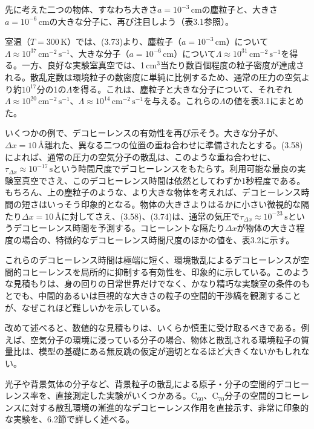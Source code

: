 \hypertarget{srcpage:138}{}\label{srcpage:138}
先に考えた二つの物体、すなわち大きさ$a=10^{-3}\,\mathrm{cm}$の塵粒子と、大きさ$a=10^{-6}\,\mathrm{cm}$の大きな分子に、再び注目しよう（表3.1参照）。

室温（$T=300\,\mathrm K$）では、(3.73)より、塵粒子（$a=10^{-3}\,\mathrm{cm}$）について$\Lambda\approx10^{37}\,\mathrm{cm}^{-2}\,\mathrm s^{-1}$、大きな分子（$a=10^{-6}\,\mathrm{cm}$）について$\Lambda\approx10^{31}\,\mathrm{cm}^{-2}\,\mathrm s^{-1}$を得る。一方、良好な実験室真空では、1\,cm$^3$当たり数百個程度の粒子密度が達成される\cite[p.~267]{ref169}。散乱定数は環境粒子の数密度に単純に比例するため、通常の圧力の空気より約$10^{17}$分の1の$\Lambda$を得る。これは、塵粒子と大きな分子について、それぞれ$\Lambda\approx10^{20}\,\mathrm{cm}^{-2}\,\mathrm s^{-1}$、$\Lambda\approx10^{14}\,\mathrm{cm}^{-2}\,\mathrm s^{-1}$を与える。これらの$\Lambda$の値を表3.1にまとめた。

いくつかの例で、デコヒーレンスの有効性を再び示そう。大きな分子が、$\Delta x=10\,\text{\AA}$離れた、異なる二つの位置の重ね合わせに準備されたとする。(3.58)によれば、通常の圧力の空気分子の散乱は、このような重ね合わせに、$\tau_{\Delta x}\approx10^{-17}\,\mathrm s$という時間尺度でデコヒーレンスをもたらす。利用可能な最良の実験室真空でさえ、このデコヒーレンス時間は依然としてわずか1秒程度である。もちろん、上の塵粒子のような、より大きな物体を考えれば、デコヒーレンス時間の短さはいっそう印象的となる。物体の大きさよりはるかに小さい微視的な隔たり$\Delta x=10\,\text{\AA}$に対してさえ、(3.58)、(3.74)は、通常の気圧で$\tau_{\Delta x}\approx10^{-23}\,\mathrm s$というデコヒーレンス時間を予測する。コヒーレントな隔たり$\Delta x$が物体の大きさ程度の場合の、特徴的なデコヒーレンス時間尺度のほかの値を、表3.2に示す。

これらのデコヒーレンス時間は極端に短く、環境散乱によるデコヒーレンスが空間的コヒーレンスを局所的に抑制する有効性を、印象的に示している。このような見積もりは、身の回りの日常世界だけでなく、かなり精巧な実験室の条件のもとでも、中間的あるいは巨視的な大きさの粒子の空間的干渉縞を観測することが、なぜこれほど難しいかを示している。

改めて述べると、数値的な見積もりは、いくらか慎重に受け取るべきである。例えば、空気分子の環境に浸っている分子の場合、物体と散乱される環境粒子の質量比は、模型の基礎にある無反跳の仮定が適切となるほど大きくないかもしれない。

光子や背景気体の分子など、背景粒子の散乱による原子・分子の空間的デコヒーレンス率を、直接測定した実験がいくつかある。C$_{60}$、C$_{70}$分子の空間的コヒーレンスに対する散乱環境の漸進的なデコヒーレンス作用を直接示す、非常に印象的な実験を、6.2節で詳しく述べる。

